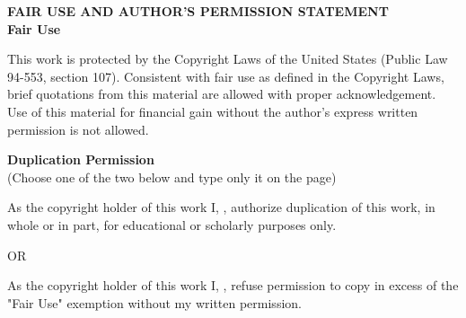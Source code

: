\thispagestyle{empty}

\begin{center}
    \doublespacing
    \textbf{FAIR USE AND AUTHOR'S PERMISSION STATEMENT} \\
    \textbf{Fair Use}
\end{center}
\begin{flushleft}
    \singlespacing
    This work is protected by the Copyright Laws of the United States (Public Law 94-553,
    section 107). Consistent with fair use as defined in the Copyright Laws, brief quotations
    from this material are allowed with proper acknowledgement. Use of this material for
    financial gain without the author's express written permission is not allowed.
    \newline
    \newline
\end{flushleft}
\begin{center}
    \doublespacing
    \textbf{Duplication Permission} \\
    (Choose one of the two below and type only it on the page)
\end{center}
\begin{flushleft}
    \singlespacing
    As the copyright holder of this work I, \myName, authorize duplication of this
    work, in whole or in part, for educational or scholarly purposes only. \\
\end{flushleft}
\begin{center}
    OR \\
\end{center}
\begin{flushleft}
    \singlespacing
    As the copyright holder of this work I, \myName, refuse permission to copy in
    excess of the "Fair Use" exemption without my written permission.

    \vfill
\end{flushleft}
